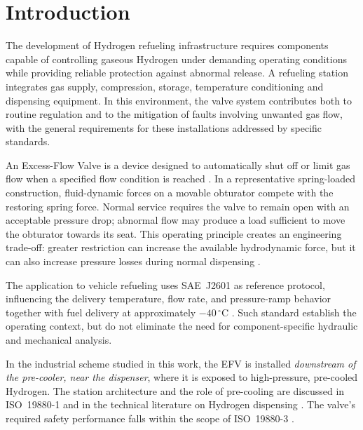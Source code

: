 \chapter*{Introduction}
\label{ch:introduction}

The development of Hydrogen refueling infrastructure requires components capable of controlling gaseous Hydrogen under demanding operating conditions while providing reliable protection against abnormal release. A refueling station integrates gas supply, compression, storage, temperature conditioning and dispensing equipment. In this environment, the valve system contributes both to routine regulation and to the mitigation of faults involving unwanted gas flow, with the general requirements for these installations addressed by specific standards.

An Excess-Flow Valve is a device designed to automatically shut off or limit gas flow when a specified flow condition is reached \cite{iso19880_3}. In a representative spring-loaded construction, fluid-dynamic forces on a movable obturator compete with the restoring spring force. Normal service requires the valve to remain open with an acceptable pressure drop; abnormal flow may produce a load sufficient to move the obturator towards its seat. This operating principle creates an engineering trade-off: greater restriction can increase the available hydrodynamic force, but it can also increase pressure losses during normal dispensing \cite{white2016,crane410,honeywell_efv}.

The application to vehicle refueling uses SAE~J2601 as reference protocol, influencing the delivery temperature, flow rate, and pressure-ramp behavior together with fuel delivery at approximately $-40\,^{\circ}\mathrm{C}$ \cite{sae_j2601}. Such standard establish the operating context, but do not eliminate the need for component-specific hydraulic and mechanical analysis.

In the industrial scheme studied in this work, the EFV is installed \emph{downstream of the pre-cooler, near the dispenser}, where it is exposed to high-pressure, pre-cooled Hydrogen. The station architecture and the role of pre-cooling are discussed in ISO~19880-1 and in the technical literature on Hydrogen dispensing \cite{iso19880_1,elgowainy2017,nrel_csd2014}. The valve's required safety performance falls within the scope of ISO~19880-3 \cite{iso19880_3}. \\

